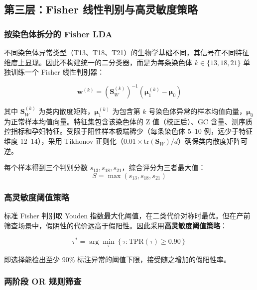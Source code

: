 \documentclass{internal-report}
\begin{document}
\subsection{第三层：Fisher 线性判别与高灵敏度策略}

\subsubsection{按染色体拆分的 Fisher LDA}

不同染色体异常类型（T13、T18、T21）的生物学基础不同，其信号在不同特征维度上显现。因此不构建统一的二分类器，而是为每条染色体 $k \in \{13,18,21\}$ 单独训练一个 Fisher 线性判别器：

\begin{equation}
\mathbf{w}^{(k)} = (\mathbf{S}_W^{(k)})^{-1} (\boldsymbol{\mu}_1^{(k)} - \boldsymbol{\mu}_0)
\end{equation}

其中 $\mathbf{S}_W^{(k)}$ 为类内散度矩阵，$\boldsymbol{\mu}_1^{(k)}$ 为包含第 $k$ 号染色体异常的样本均值向量，$\boldsymbol{\mu}_0$ 为正常样本均值向量。特征集包含该染色体的 Z 值（校正后）、GC 含量、测序质控指标和孕妇特征。受限于阳性样本极端稀少（每条染色体 5--10 例，远少于特征维度 12--14），采用 Tikhonov 正则化（$0.01 \times \mathrm{tr}(\mathbf{S}_W)/d$）确保类内散度矩阵可逆。

每个样本得到三个判别分数 $s_{13}, s_{18}, s_{21}$，综合评分为三者最大值：
\begin{equation}
S = \max(s_{13}, s_{18}, s_{21})
\end{equation}

\subsubsection{高灵敏度阈值策略}

标准 Fisher 判别取 Youden 指数最大化阈值，在二类代价对称时最优。但在产前筛查场景中，假阴性的代价远高于假阳性。因此采用\textbf{高灵敏度阈值策略}：

\begin{equation}
\tau^* = \arg\min_{\tau} \left\{ \tau : \text{TPR}(\tau) \geq 0.90 \right\}
\end{equation}

即选择能检出至少 90\% 标注异常的阈值下限，接受随之增加的假阳性率。

\subsubsection{两阶段 OR 规则筛查}
\end{document}
